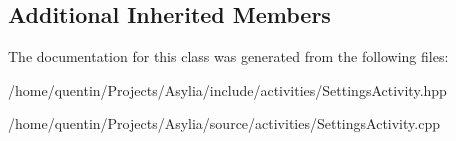 \subsection*{Additional Inherited Members}


The documentation for this class was generated from the following files\-:\begin{DoxyCompactItemize}
\item 
/home/quentin/\-Projects/\-Asylia/include/activities/Settings\-Activity.\-hpp\item 
/home/quentin/\-Projects/\-Asylia/source/activities/Settings\-Activity.\-cpp\end{DoxyCompactItemize}

